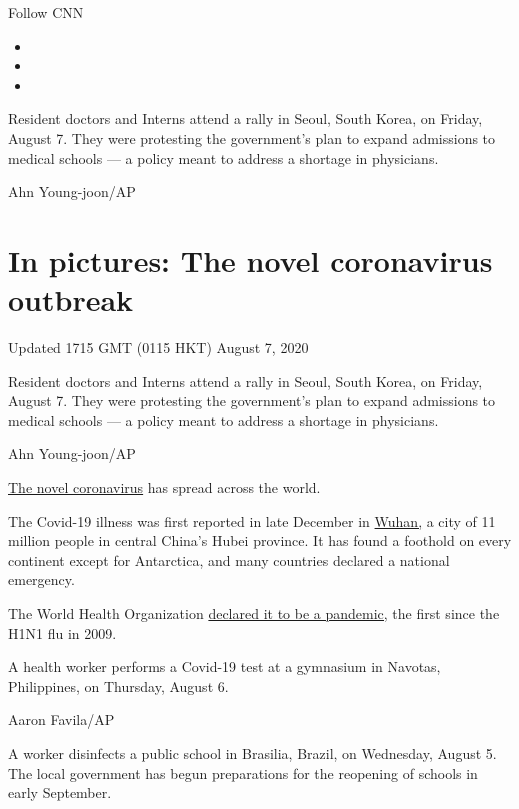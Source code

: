 Follow CNN

\begin{itemize}
\item
\item
\item
\end{itemize}

Resident doctors and Interns attend a rally in Seoul, South Korea, on
Friday, August 7. They were protesting the government's plan to expand
admissions to medical schools --- a policy meant to address a shortage
in physicians.

Ahn Young-joon/AP

\hypertarget{in-pictures-the-novel-coronavirus-outbreak}{%
\section{In pictures: The novel coronavirus
outbreak}\label{in-pictures-the-novel-coronavirus-outbreak}}

Updated 1715 GMT (0115 HKT) August 7, 2020

Resident doctors and Interns attend a rally in Seoul, South Korea, on
Friday, August 7. They were protesting the government's plan to expand
admissions to medical schools --- a policy meant to address a shortage
in physicians.

Ahn Young-joon/AP

\href{https://edition.cnn.com/specials/asia/coronavirus-outbreak-intl-hnk}{The
novel coronavirus} has spread across the world.

The Covid-19 illness was first reported in late December in
\href{https://www.cnn.com/travel/article/wuhan-china-virus/index.html}{Wuhan,}
a city of 11 million people in central China's Hubei province. It has
found a foothold on every continent except for Antarctica, and many
countries declared a national emergency.

The World Health Organization
\href{https://www.cnn.com/2020/03/11/health/coronavirus-pandemic-world-health-organization/index.html}{declared
it to be a pandemic,} the first since the H1N1 flu in 2009.

A health worker performs a Covid-19 test at a gymnasium in Navotas,
Philippines, on Thursday, August 6.

Aaron Favila/AP

A worker disinfects a public school in Brasilia, Brazil, on Wednesday,
August 5. The local government has begun preparations for the reopening
of schools in early September.


